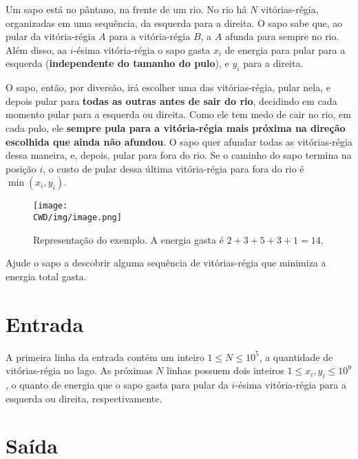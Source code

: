 %

Um sapo está no pântano, na frente de um rio. No rio há $N$ vitórias-régia, organizadas em uma sequência, da esquerda para a direita. O sapo sabe que, ao pular da vitória-régia $A$ para a vitória-régia $B$, a $A$ afunda para sempre no rio. Além disso, aa $i$-ésima vitória-régia o sapo gasta $x_i$ de energia para pular para a esquerda (\textbf{independente do tamanho do pulo}), e $y_i$ para a direita.

O sapo, então, por diversão, irá escolher uma das vitórias-régia, pular nela, e depois pular para \textbf{todas as outras antes de sair do rio}, decidindo em cada momento pular para a esquerda ou direita. Como ele tem medo de cair no rio, em cada pulo, ele \textbf{sempre pula para a vitória-régia mais próxima na direção escolhida que ainda não afundou}. O sapo quer afundar todas as vitórias-régia dessa maneira, e, depois, pular para fora do rio. Se o caminho do sapo termina na posição $i$, o custo de pular dessa última vitória-régia para fora do rio é $\min(x_i, y_i)$.

\begin{figure}[H]
  \centering
  \texttt{[image: \\CWD/img/image.png]}
  \caption{Representação do exemplo. A energia gasta é $2+3+5+3+1=14$.}
\end{figure}

Ajude o sapo a descobrir alguma sequência de vitórias-régia que minimiza a energia total gasta.

%
%

\section*{Entrada}

A primeira linha da entrada contém um inteiro $1 \leq N \leq 10^5$, a quantidade de vitórias-régia no lago. As próximas $N$ linhas possuem dois inteiros $1 \leq x_i, y_i \leq 10^9$, o quanto de energia que o sapo gasta para pular da $i$-ésima vitória-régia para a esquerda ou direita, respectivamente.

%
%

\section*{Saída}

